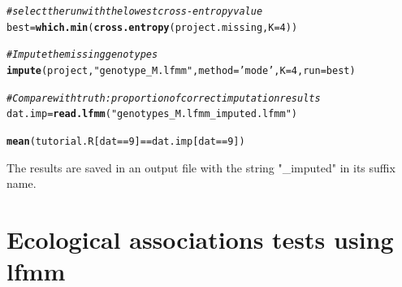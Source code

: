 \documentclass[12pt,a4paper,oneside]{article}\usepackage[]{graphicx}\usepackage[]{color}
\makeatletter
\newcommand{\hlnum}[1]{\textcolor[rgb]{0.686,0.059,0.569}{#1}}%
\newcommand{\hlstr}[1]{\textcolor[rgb]{0.192,0.494,0.8}{#1}}%
\newcommand{\hlcom}[1]{\textcolor[rgb]{0.678,0.584,0.686}{\textit{#1}}}%
\newcommand{\hlopt}[1]{\textcolor[rgb]{0,0,0}{#1}}%
\newcommand{\hlstd}[1]{\textcolor[rgb]{0.345,0.345,0.345}{#1}}%
\newcommand{\hlkwb}[1]{\textcolor[rgb]{0.69,0.353,0.396}{#1}}%
\newcommand{\hlkwc}[1]{\textcolor[rgb]{0.333,0.667,0.333}{#1}}%
\newcommand{\hlkwd}[1]{\textcolor[rgb]{0.737,0.353,0.396}{\textbf{#1}}}%
\newenvironment{kframe}{%
 \def\at@end@of@kframe{}%
 \ifinner\ifhmode%
  \def\at@end@of@kframe{\end{minipage}}%
  \begin{minipage}{\columnwidth}%
 \fi\fi%
 \def\FrameCommand##1{\hskip\@totalleftmargin \hskip-\fboxsep
 \colorbox{shadecolor}{##1}\hskip-\fboxsep
     \hskip-\linewidth \hskip-\@totalleftmargin \hskip\columnwidth}%
 \MakeFramed {\advance\hsize-\width
   \@totalleftmargin\z@ \linewidth\hsize
   \@setminipage}}%
 {\par\unskip\endMakeFramed%
 \at@end@of@kframe}
\newenvironment{knitrout}{}{} %
\makeatother
\begin{document}
\begin{knitrout}
\color{fgcolor}\begin{kframe}
\begin{alltt}
\hlcom{# select the run with the lowest cross-entropy value}
\hlstd{best} \hlkwb{=} \hlkwd{which.min}\hlstd{(}\hlkwd{cross.entropy}\hlstd{(project.missing,} \hlkwc{K} \hlstd{=} \hlnum{4}\hlstd{))}

\hlcom{# Impute the missing genotypes}
\hlkwd{impute}\hlstd{(project,} \hlstr{"genotype_M.lfmm"}\hlstd{,} \hlkwc{method} \hlstd{=} \hlstr{'mode'}\hlstd{,} \hlkwc{K} \hlstd{=} \hlnum{4}\hlstd{,} \hlkwc{run} \hlstd{= best)}
\end{alltt}


{\ttfamily\noindent\bfseries{}}\begin{alltt}
\hlcom{# Compare with truth: proportion of correct imputation results}
\hlstd{dat.imp} \hlkwb{=} \hlkwd{read.lfmm}\hlstd{(}\hlstr{"genotypes_M.lfmm_imputed.lfmm"}\hlstd{)}
\end{alltt}


{\ttfamily\noindent{}}

{\ttfamily\noindent\bfseries{}}\begin{alltt}
\hlkwd{mean}\hlstd{( tutorial.R[dat} \hlopt{==} \hlnum{9}\hlstd{]} \hlopt{==} \hlstd{dat.imp[dat} \hlopt{==} \hlnum{9}\hlstd{] )}
\end{alltt}


{\ttfamily\noindent\bfseries\color{errorcolor}{\#\# Error in mean(tutorial.R[dat == 9] == dat.imp[dat == 9]): objet 'dat.imp' introuvable}}\end{kframe}
\end{knitrout}
 
The results are saved in an output file with the string "_imputed" in its suffix name.

\section{Ecological associations tests using lfmm}
\end{document}
